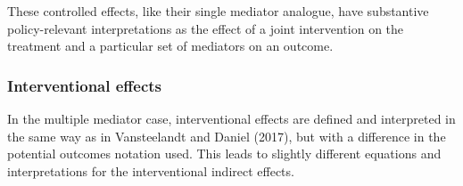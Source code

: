\documentclass[12pt]{article} %
\numberwithin{equation}{section} %
\begin{document}
These controlled effects, like their single mediator analogue, have substantive policy-relevant interpretations as the effect of a joint intervention on the treatment and a particular set of mediators on an outcome. 

\subsubsection{Interventional effects}
\label{sec:interventional effects}

In the multiple mediator case, interventional effects are defined and interpreted in the same way as in Vansteelandt and Daniel (2017), but with a difference in the potential outcomes notation used. This leads to slightly different equations and interpretations for the interventional indirect effects. 
\end{document}

